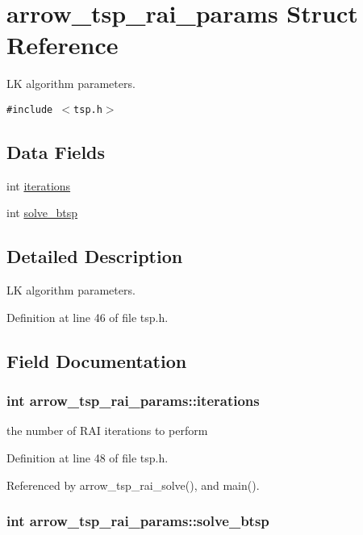 \hypertarget{structarrow__tsp__rai__params}{
\section{arrow\_\-tsp\_\-rai\_\-params Struct Reference}
\label{structarrow__tsp__rai__params}
}
LK algorithm parameters.  


{\tt \#include $<$tsp.h$>$}

\subsection*{Data Fields}
\begin{CompactItemize}
\item 
int \hyperlink{structarrow__tsp__rai__params_14326a50f514b040d8ec09d4cbbc2b5e}{iterations}
\item 
int \hyperlink{structarrow__tsp__rai__params_6602b034ac2eb2373184a028f0efc695}{solve\_\-btsp}
\end{CompactItemize}


\subsection{Detailed Description}
LK algorithm parameters. 

Definition at line 46 of file tsp.h.

\subsection{Field Documentation}
\hypertarget{structarrow__tsp__rai__params_14326a50f514b040d8ec09d4cbbc2b5e}{
\subsubsection[{iterations}]{\setlength{\rightskip}{0pt plus 5cm}int {\bf arrow\_\-tsp\_\-rai\_\-params::iterations}}}
\label{structarrow__tsp__rai__params_14326a50f514b040d8ec09d4cbbc2b5e}


the number of RAI iterations to perform 

Definition at line 48 of file tsp.h.

Referenced by arrow\_\-tsp\_\-rai\_\-solve(), and main().\hypertarget{structarrow__tsp__rai__params_6602b034ac2eb2373184a028f0efc695}{
\subsubsection[{solve\_\-btsp}]{\setlength{\rightskip}{0pt plus 5cm}int {\bf arrow\_\-tsp\_\-rai\_\-params::solve\_\-btsp}}}
\label{structarrow__tsp__rai__params_6602b034ac2eb2373184a028f0efc695}


